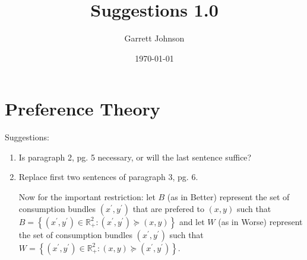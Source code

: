 \documentclass[12pt, fleqn]{article}
\begin{document}
\title{Suggestions 1.0}
\author{Garrett Johnson}
\date{\today}
\maketitle

\section{Preference Theory}
Suggestions:
\begin{enumerate}
       \item Is paragraph 2, pg. 5 necessary, or will the last sentence suffice?
       \item Replace first two sentences of paragraph 3, pg. 6. 
       
       Now for the important restriction: let $B$ (as in Better) represent the set of consumption bundles $\left(x^{\prime},y^{\prime}\right)$ that are prefered to $\left(x,y\right)$ such that $B=\left\{\left(x^{\prime},y^{\prime}\right) \in\mathbb{R}_{+}^{2} : \left(x^{\prime},y^{\prime} \right) \succeq\left(x,y\right) \right\}$ and let $W$ (as in Worse) represent the set of consumption bundles $\left(x^{\prime},y^{\prime} \right)$ such that $W=\left\{ \left( x^{\prime},y^{\prime}\right) \in\mathbb{R}_{+}^{2} : \left(x,y\right) \succeq \left(x^{\prime}, y^{\prime}\right) \right\}$. 
       

\end{enumerate}
\end{document}
